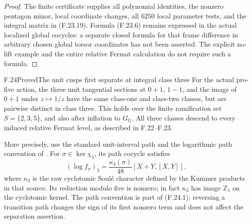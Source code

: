 \begin{proof}
The finite certificate supplies all polynomial identities,
the nonzero pentagon minor, local coordinate changes,
all \(6250\) local parameter tests, and the integral
matrix in (F.23.19). Formula (F.23.6) remains expressed
in the actual localized global cocycles: a separate
closed formula for that frame difference in arbitrary
chosen global torsor coordinates has not been asserted.
The explicit no-lift example and the entire relative
Fermat calculation do not require such a formula.
\end{proof}

\begin{statement}{F.24}{Proved}{The unit cusps first separate at integral class three}
For the actual pro-five action, the three unit tangential
sections at \(0+1\), \(1-1\), and the image of \(0+1\)
under \(z\mapsto1/z\) have the same class-one and
class-two classes, but are pairwise distinct in class
three. This holds over the finite ramification set
\(S=\{2,3,5\}\), and also after inflation to \(G_{\mathbb Q}\).
All three classes descend to every induced relative
Fermat level, as described in F.22--F.23.

More precisely, use the standard unit-interval path
and the logarithmic path convention of
\citet[\S2.1, (2.4), Proposition~2.2 and Lemma~2.4]{FA_NakamuraSakugawaWojtkowiak2017}.
For \(\sigma\in\ker\chi_5\), its path cocycle satisfies
\[
       (\log f_\sigma)_3
            =\frac{\kappa_3(\sigma)}{48}
                         [X+Y,[X,Y]],                       \tag{F.24.1}
\]
where \(\kappa_3\) is the raw cyclotomic Soulé character
defined by the Kummer products in that source.
Its reduction modulo five is nonzero; in fact
\(\kappa_3\) has image \(\mathbb Z_5\) on the
cyclotomic kernel. The path convention is part of
(F.24.1); reversing a transition path changes the
sign of its first nonzero term and does not affect
the separation assertion.
\end{statement}
